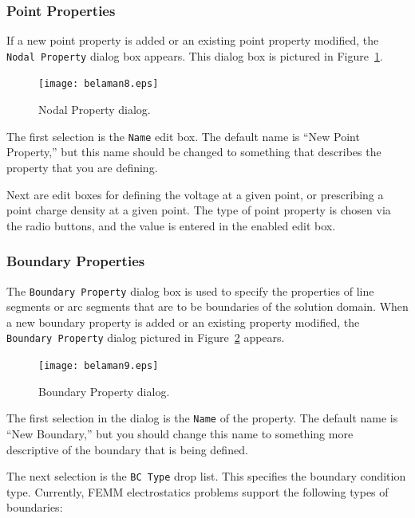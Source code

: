 \documentclass[12pt]{report}
\begin{document}
\subsubsection{Point Properties}

If a new point property is added or an existing point property modified, the
\texttt{Nodal Property} dialog box appears. This dialog box is pictured in
Figure~\ref{fig8}.

\begin{figure}[htbp]
\centerline{\texttt{[image: belaman8.eps]}}
\caption{Nodal Property dialog.}
\label{fig8}
\end{figure}




The first selection is the \texttt{Name} edit box. The default name
is ``New Point Property,'' but this name should be changed to
something that describes the property that you are defining.





Next are edit boxes for defining the voltage at a given point, or
prescribing a point charge density at a given point. The type of point
property is chosen via the radio buttons, and the value is entered in the
enabled edit box.

\subsubsection{Boundary Properties}





The \texttt{Boundary Property} dialog box is used to specify the
properties of line segments or arc segments that are to be
boundaries of the solution domain. When a new boundary property is
added or an existing property modified, the \texttt{Boundary
Property} dialog pictured in Figure~\ref{fig9} appears.

\begin{figure}[htbp]
\centerline{\texttt{[image: belaman9.eps]}}
\caption{Boundary Property dialog.}
\label{fig9}
\end{figure}

The first selection in the dialog is the \texttt{Name} of the
property. The default name is ``New Boundary,'' but you should
change this name to something more descriptive of the boundary that
is being defined.

The next selection is the \texttt{BC Type} drop list. This
specifies the boundary condition type. Currently, FEMM electrostatics problems 
support the following types of boundaries:
\end{document}
